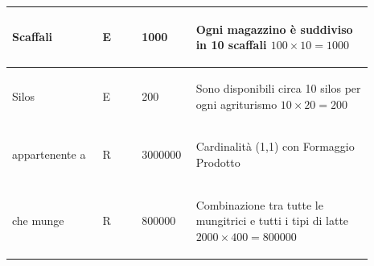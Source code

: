 \documentclass[12pt,a4paper]{article}
\begin{document}
\begin{center}
\begin{longtable}{|p{0.23\linewidth}|p{0.1\linewidth}|p{0.11\linewidth}|p{0.45\linewidth}|}
\hline
Scaffali 				& \begin{center}
\vspace{-25pt}E
\end{center}
					& \begin{center}
					\vspace{-25pt}1000\end{center}
					& \begin{flushleft}\vspace{-25pt} Ogni magazzino è suddiviso in 10 scaffali $100\times 10=1000$\end{flushleft}\\ 

\hline
Silos 				& \begin{center}
\vspace{-25pt}E
\end{center}
					& \begin{center}
					\vspace{-25pt}200\end{center}
					& \begin{flushleft}\vspace{-25pt} Sono disponibili circa 10 silos per ogni agriturismo $10\times 20=200$ \end{flushleft}\\ 

\hline
appartenente a 				& \begin{center}
\vspace{-25pt}R
\end{center}
					& \begin{center}
					\vspace{-25pt}3000000\end{center}
					& \begin{flushleft}\vspace{-25pt} Cardinalità (1,1) con Formaggio Prodotto \end{flushleft}\\ 

\hline
che munge 				& \begin{center}
\vspace{-25pt}R
\end{center}
					& \begin{center}
					\vspace{-25pt}800000\end{center}
					& \begin{flushleft}\vspace{-25pt} Combinazione tra tutte le mungitrici e tutti i tipi di latte $2000\times 400= 800000$ \end{flushleft}\\ 


\end{longtable}
\end{center}
\end{document}
